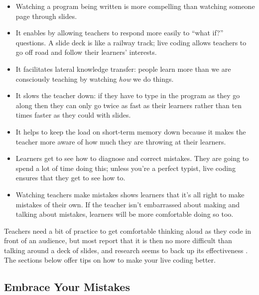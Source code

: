 \begin{itemize}

\item
  Watching a program being written is more compelling
  than watching someone page through slides.

\item
  It enables 
  by allowing teachers to respond more easily to ``what if?'' questions.
  A slide deck is like a railway track;
  live coding allows teachers to go off road and follow their learners' interests.

\item
  It facilitates lateral knowledge transfer:
  people learn more than we are consciously teaching
  by watching \emph{how} we do things.

\item
  It slows the teacher down:
  if they have to type in the program as they go along
  then they can only go twice as fast as their learners
  rather than ten times faster as they could with slides.

\item
  It helps to keep the load on short-term memory down
  because it makes the teacher more aware of how much they are throwing at their learners.

\item
  Learners get to see how to diagnose and correct mistakes.
  They are going to spend a lot of time doing this;
  unless you're a perfect typist,
  live coding ensures that they get to see how to.

\item
  Watching teachers make mistakes shows learners that
  it's all right to make mistakes of their own.
  If the teacher isn't embarrassed about making and talking about mistakes,
  learners will be more comfortable doing so too.

\end{itemize}

Teachers need a bit of practice to get comfortable
thinking aloud as they code in front of an audience,
but most report that it is then no more difficult than talking around a deck of slides,
and research seems to back up its effectiveness \cite{Rubi2013,Haar2017}.
The sections below offer tips on how to make your live coding better.

\subsection*{Embrace Your Mistakes}

